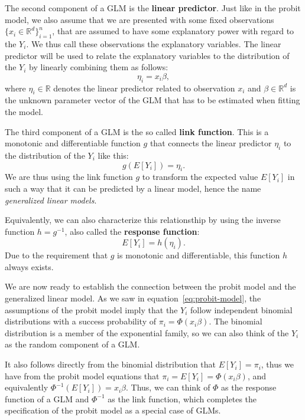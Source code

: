 The second component of a GLM is the \textbf{linear predictor}.
Just like in the probit model, we also assume that we are
presented with some fixed observations $\{x_i \in \mathbb{R}^d\}_{i=1}^n$,
that are assumed to have some explanatory power with regard to
the $Y_i$. We thus call these observations the explanatory variables.
The linear predictor will be used to relate the explanatory variables
to the distribution of the $Y_i$ by linearly combining them as follows:
\begin{equation*}
    \eta_i = x_i \beta,
\end{equation*}
where $\eta_i \in \mathbb{R}$ denotes the linear predictor related
to observation $x_i$ and
$\beta \in \mathbb{R}^d$ is the unknown parameter vector of the GLM
that has to be estimated when fitting the model.

The third component of a GLM is the so called \textbf{link function}.
This is a monotonic and differentiable function
$g$
that connects the linear predictor $\eta_i$ to the distribution of the
$Y_i$ like this:
\begin{equation*}
    g(E[Y_i]) = \eta_i.
\end{equation*}
We are thus using the link function $g$ to transform the expected value
$E[Y_i]$ in such a way that it can be predicted by a linear model,
hence the name \textit{generalized linear models}.

Equivalently, we can also characterize this relationsthip by using
the inverse function $h = g^{-1}$,
also called the \textbf{response function}:
\begin{equation*}
    E[Y_i] = h(\eta_i).
\end{equation*}
Due to the requirement that $g$ is monotonic and differentiable,
this function $h$ always exists.

We are now ready to establish the connection between the probit model and
the generalized linear model.
As we saw in equation~\ref{eq:probit-model}, the assumptions of the
probit model imply that the $Y_i$ follow independent binomial distributions
with a success probability of $\pi_i = \Phi(x_i \beta)$.
The binomial distribution is a member of the exponential family, so
we can also think of the $Y_i$ as the random component of a GLM.

It also follows directly from the binomial distribution that
$E[Y_i] = \pi_i$, thus we have from the probit model equations that
$\pi_i = E[Y_i] = \Phi(x_i \beta)$, and equivalently
$\Phi^{-1}(E[Y_i]) = x_i \beta$. Thus, we can think of $\Phi$ as the response
function of a GLM and $\Phi^{-1}$ as the link function, which completes
the specification of the probit model as a special case of GLMs.

